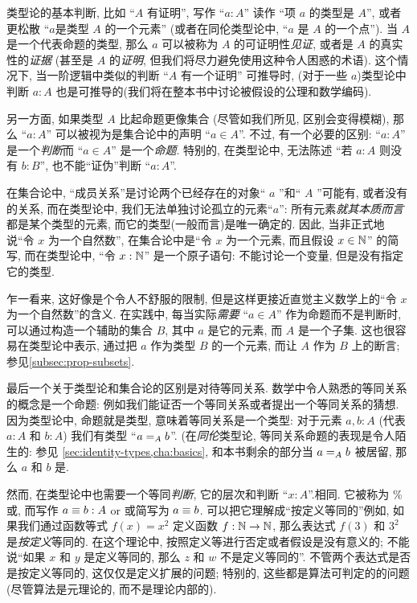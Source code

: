 类型论的基本判断, 比如 ``$A$ 有证明'', 写作 ``$a:A$'' 读作 ``项 $a$ 的类型是 $A$'', 或者更松散 ``$a$是类型 $A$ 的一个元素'' (或者在同伦类型论中, ``$a$ 是 $A$ 的一个点''). %
%
%
当 $A$ 是一个代表命题的类型, 那么 $a$ 可以被称为 $A$ 的可证明性\emph{见证}, 或者是 $A$ 的真实性的\emph{证据} (甚至是 $A$ 的\emph{证明}, 但我们将尽力避免使用这种令人困惑的术语). 这个情况下, 当一阶逻辑中类似的判断 ``$A$ 有一个证明'' 可推导时, (对于一些 $a$)类型论中判断 $a:A$ 也是可推导的(我们将在整本书中讨论被假设的公理和数学编码).

另一方面, 如果类型 $A$ 比起命题更像集合 (尽管如我们所见, 区别会变得模糊), 那么 ``$a:A$'' 可以被视为是集合论中的声明 ``$a\in A$''. 不过, 有一个必要的区别: ``$a:A$'' 是一个\emph{判断}而 ``$a\in A$'' 是一个\emph{命题}. 特别的, 在类型论中, 无法陈述 ``若 $a:A$ 则没有 $b:B$'', 也不能``证伪''判断 ``$a:A$''.

在集合论中, ``成员关系''是讨论两个已经存在的对象`` $a$ ''和`` $A$ ''可能有, 或者没有的关系, 而在类型论中, 我们无法单独讨论孤立的元素``$a$'': 所有元素\emph{就其本质而言}都是某个类型的元素, 而它的类型(一般而言)是唯一确定的. 因此, 当非正式地说``令 $x$ 为一个自然数'', 在集合论中是``令 $x$ 为一个元素, 而且假设 $x\in\nat$'' 的简写, 而在类型论中, ``令 $x:\nat$'' 是一个原子语句: 不能讨论一个变量, 但是没有指定它的类型.


乍一看来, 这好像是个令人不舒服的限制, 但是这样更接近直觉主义数学上的``令 $x$ 为一个自然数''的含义. 在实践中, 每当实际\emph{需要} ``$a\in A$'' 作为命题而不是判断时, 可以通过构造一个辅助的集合 $B$, 其中 $a$ 是它的元素, 而 $A$ 是一个子集. 这也很容易在类型论中表示, 通过把 $a$ 作为类型 $B$ 的一个元素, 而让 $A$ 作为 $B$ 上的断言;  参见\cref{subsec:prop-subsets}.

最后一个关于类型论和集合论的区别是对待等同关系. 数学中令人熟悉的等同关系的概念是一个命题:  例如我们能证否一个等同关系或者提出一个等同关系的猜想. 因为类型论中, 命题就是类型, 意味着等同关系是一个类型: 对于元素 $a,b:A$ (代表 $a:A$ 和 $b:A$) 我们有类型 ``$\id[A]ab$''. (在\emph{同伦}类型论, 等同关系命题的表现是令人陌生的: 参见 \cref{sec:identity-types,cha:basics}, 和本书剩余的部分当 $\id[A]ab$ 被居留, 那么 $a$ 和 $b$ 是. %
%

然而, 在类型论中也需要一个等同\emph{判断}, 它的层次和判断 ``$x:A$''.相同.%
它被称为 \%%
%
或, %
%
而写作 $a\jdeq b : A$ or 或简写为 $a \jdeq b$. 可以把它理解成``按定义等同的''例如, 如果我们通过函数等式 $f(x)=x^2$ 定义函数 $f:\nat\to\nat$, 那么表达式 $f(3)$ 和 $3^2$ 是\emph{按定义}等同的. 在这个理论中, 按照定义等进行否定或者假设是没有意义的; 不能说``如果 $x$ 和 $y$ 是定义等同的, 那么 $z$ 和 $w$ 不是定义等同的''. 不管两个表达式是否是按定义等同的, 这仅仅是定义扩展的问题; 特别的, 这些都是算法可判定的的问题(尽管算法是元理论的, 而不是理论内部的).

